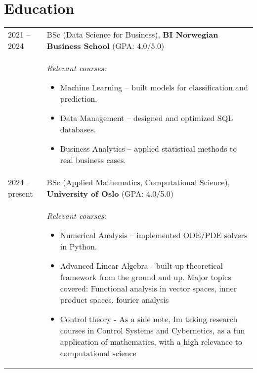 \documentclass[a4paper,12pt]{article}
\begin{document}
\section{Education}
\begin{tabularx}{\linewidth}{@{}l X@{}}	

2021 -- 2024 & 
BSc (Data Science for Business), \textbf{BI Norwegian Business School} 
\hfill \normalsize (GPA: 4.0/5.0) \\
& \begin{minipage}[t]{\linewidth}
    \textit{Relevant courses:}  
    \begin{itemize}[leftmargin=*]
        \item Machine Learning – built models for classification and prediction.  
        \item Data Management – designed and optimized SQL databases.  
        \item Business Analytics – applied statistical methods to real business cases.  
    \end{itemize}
   \end{minipage} \\[1ex]

2024 -- present & 
BSc (Applied Mathematics, Computational Science), \textbf{University of Oslo}  
\hfill (GPA: 4.0/5.0) \\
& \begin{minipage}[t]{\linewidth}
    \textit{Relevant courses:}  
    \begin{itemize}[leftmargin=*]
        \item Numerical Analysis – implemented ODE/PDE solvers in Python.  
        \item Advanced Linear Algebra - built up theoretical framework from the ground and up. Major topics covered: Functional analysis in vector spaces, inner product spaces, fourier analysis  
        \item Control theory - As a side note, Im taking research courses in Control Systems and Cybernetics, as a fun application of mathematics, with a high relevance to computational science 
    \end{itemize}
   \end{minipage} \\

\end{tabularx}



\end{document}

